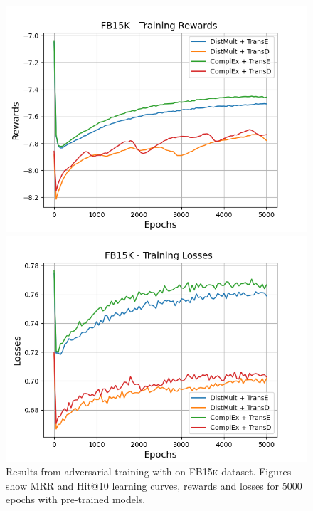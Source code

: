 \begin{figure}
    \begin{minipage}{.5\textwidth}
      \centering
      \includegraphics[width=\linewidth]{figures/results/gan_train/pretrained/random/fb15k/random_fb15k_rew.png}
    \end{minipage}%
     \begin{minipage}{.5\textwidth}
      \centering
      \includegraphics[width=\linewidth]{figures/results/gan_train/pretrained/random/fb15k/random_fb15k_losses.png}
    \end{minipage}%
    \caption{Results from adversarial training with \origsampling on \textsc{FB15k} dataset.
    Figures show MRR and Hit@10 learning curves, rewards and losses for 5000 epochs with pre-trained models.}
    \label{fig:gan_train_pretrained_random_fb15k}
\end{figure}
